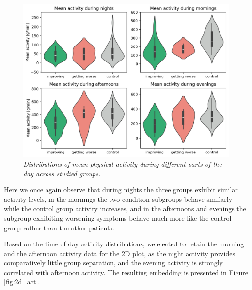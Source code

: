 \documentclass[12pt]{article}
\begin{document}
\begin{figure}[!t]
    \centering
    \includegraphics[width=.9\textwidth]{images/act_pod.png}
    \captionsetup{justification=centering}
    \caption{\textit{Distributions of mean physical activity during different parts of the day across studied groups.}}
    \label{fig:act_pod}
\end{figure}

Here we once again observe that during nights the three groups exhibit similar activity levels, in the mornings the two condition subgroups behave similarly while the control group activity increases, and in the afternoons and evenings the subgroup exhibiting worsening symptoms behave much more like the control group rather than the other patients.

Based on the time of day activity distributions, we elected to retain the morning and the afternoon activity data for the 2D plot, as the night activity provides comparatively little group separation, and the evening activity is strongly correlated with afternoon activity. The resulting embedding is presented in Figure \ref{fig:2d_act}. 
\end{document}
